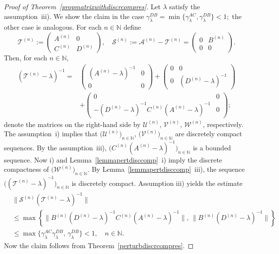 \documentclass[a4paper,reqno]{amsart}
\begin{document}
\begin{proof}[Proof of Theorem~{\rm\ref{propmatrixwithdiscrcompres}}]
Let $\lambda$  satisfy the assumption~iii).
We show the claim in the case $\gamma_\lambda^{DB}=\min\big\{\gamma_\lambda^{AC},\gamma_\lambda^{DB}\big\}<1;$ the other case is analogous.
For each $n\in{\mathbb{N}}$ define $${\mathcal T}^{(n)}:=\begin{pmatrix} A^{(n)} & 0\\ C^{(n)} &D^{(n)}\end{pmatrix}, \quad {\mathcal S}^{(n)}:={\mathcal A}^{(n)}-{\mathcal T}^{(n)}=\begin{pmatrix} 0 & B^{(n)}\\ 0 & 0\end{pmatrix}.$$
Then, for each $n\in{\mathbb{N}}$, 
\begin{align*}
({\mathcal T}^{(n)}-\lambda)^{-1}=&\begin{pmatrix} (A^{(n)}-\lambda)^{-1} & 0\\ 0 & 0\end{pmatrix}+ \begin{pmatrix} 0 & 0\\ 0 & (D^{(n)}-\lambda)^{-1}\end{pmatrix}\\[1mm]
&+\begin{pmatrix} 0 & 0 \\ -(D^{(n)}-\lambda)^{-1}C^{(n)}(A^{(n)}-\lambda)^{-1} & 0\end{pmatrix};
\end{align*}
denote the matrices on the right-hand side by $\mathcal U^{(n)}$, $\mathcal V^{(n)}$, $\mathcal W^{(n)}$, respectively.
The assumption~i) implies that $\big(\mathcal U^{(n)}\big)_{n\in{\mathbb{N}}}$, $\big(\mathcal V^{(n)}\big)_{n\in{\mathbb{N}}}$ are discretely compact sequences.
By the assumption~iii), $\big(C^{(n)}(A^{(n)}-\lambda)^{-1}\big)_{n\in{\mathbb{N}}}$ is a bounded sequence. Now i) and Lemma~\ref{lemmapertdisccomp}~i) imply the discrete compactness of $\big(\mathcal W^{(n)}\big)_{n\in{\mathbb{N}}}$.
By Lemma~\ref{lemmapertdisccomp}~iii), the sequence $\big(({\mathcal T}^{(n)}-\lambda)^{-1}\big)_{n\in{\mathbb{N}}}$ is discretely compact.
Assumption iii) yields the estimate
\begin{align*}
&\big\|{\mathcal S}^{(n)}({\mathcal T}^{(n)}-\lambda)^{-1}\big\|\\
 &\leq\max\left\{\big\|B^{(n)}(D^{(n)}-\lambda)^{-1}C^{(n)}(A^{(n)}-\lambda)^{-1}\big\|, \,\big\|B^{(n)}(D^{(n)}-\lambda)^{-1}\big\|\right\}\\
&\leq \max\{\gamma_\lambda^{AC} \gamma_\lambda^{DB},\,\gamma_\lambda^{DB}\}<1, \quad n\in{\mathbb{N}}.
\end{align*}
Now the claim follows from Theorem~\ref{perturbdiscrcompres}.
\end{proof}
\end{document}
